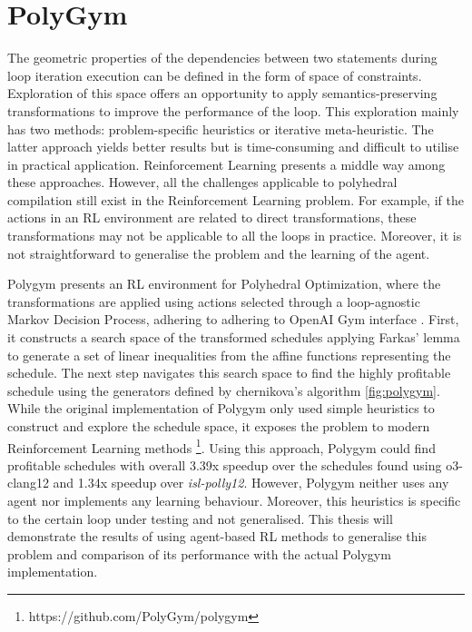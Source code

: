 \documentclass[logo,msc]{infthesis}           %
\begin{document}
\section{PolyGym}

The geometric properties of the dependencies between two statements during loop iteration execution can be defined in the form of space of constraints. Exploration of this space offers an opportunity to apply semantics-preserving transformations to improve the performance of the loop. This exploration mainly has two methods: problem-specific heuristics or iterative meta-heuristic. The latter approach yields better results but is time-consuming and difficult to utilise in practical application. Reinforcement Learning presents a middle way among these approaches. However, all the challenges applicable to polyhedral compilation still exist in the Reinforcement Learning problem. For example, if the actions in an RL environment are related to direct transformations, these transformations may not be applicable to all the loops in practice. Moreover, it is not straightforward to generalise the problem and the learning of the agent.

Polygym presents an RL environment for Polyhedral Optimization, where the transformations are applied using actions selected through a loop-agnostic Markov Decision Process, adhering to adhering to OpenAI Gym interface \cite{Gym}. First, it constructs a search space of the transformed schedules applying Farkas' lemma to generate a set of linear inequalities from the affine functions representing the schedule. The next step navigates this search space to find the highly profitable schedule using the generators defined by chernikova's algorithm \ref{fig:polygym}. While the original implementation of Polygym only used simple heuristics to construct and explore the schedule space, it exposes the problem to modern Reinforcement Learning methods \footnote{https://github.com/PolyGym/polygym}. Using this approach, Polygym could find profitable schedules with overall 3.39x speedup over the schedules found using o3-clang12 and 1.34x speedup over \textit{isl-polly12}. However, Polygym neither uses any agent nor implements any learning behaviour. Moreover, this heuristics is specific to the certain loop under testing and not generalised. This thesis will demonstrate the results of using agent-based RL methods to generalise this problem and comparison of its performance with the actual Polygym implementation.
\end{document}
